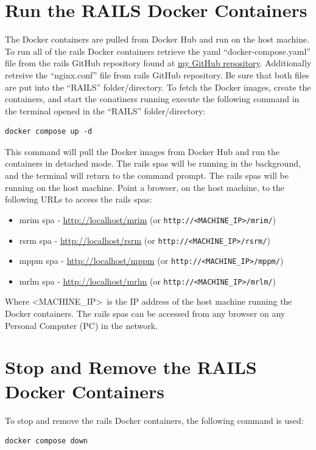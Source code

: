 \section{Run the RAILS Docker Containers}
\label{sec:railsdockercontainers}
The Docker containers are pulled from Docker Hub and run on the host machine. To run all of the \gls{rails} Docker containers retrieve the \gls{yaml} ``docker-compose.yaml'' file from the \gls{rails} GitHub repository found at \href{https://github.com/djbristow/RAILS/tree/master/Docker%20Based}{my GitHub repository}. Additionally retreive the ``nginx.conf'' file from \gls{rails} GitHub repository. Be sure that both files are put into the ``RAILS'' folder/directory. 
To fetch the Docker images, create the containers, and start the conatiners running execute the following command in the terminal opened in the ``RAILS'' folder/directory:
\begin{verbatim}
docker compose up -d
\end{verbatim}
This command will pull the Docker images from Docker Hub and run the containers in detached mode. The \gls{rails} \glspl{spa} will be running in the background, and the terminal will return to the command prompt.
The \gls{rails} \glspl{spa} will be running on the host machine.
Point a browser, on the host machine, to the following URLs to access the \gls{rails} \glspl{spa}:
\begin{itemize}
    \item \gls{mrim} \gls{spa} - \href{http://localhost/mrim}{http://localhost/mrim} (or \texttt{http://\textless MACHINE\_IP\textgreater /mrim/})
    \item \gls{rsrm} \gls{spa} - \href{http://localhost/rsrm}{http://localhost/rsrm} (or \texttt{http://\textless MACHINE\_IP\textgreater /rsrm/})
    \item \gls{mppm} \gls{spa} - \href{http://localhost/mppm}{http://localhost/mppm} (or \texttt{http://\textless MACHINE\_IP\textgreater /mppm/})
    \item \gls{mrlm} \gls{spa} - \href{http://localhost/mrlm}{http://localhost/mrlm} (or \texttt{http://\textless MACHINE\_IP\textgreater /mrlm/})
\end{itemize}
Where \textless MACHINE\_IP\textgreater\ is the IP address of the host machine running the Docker containers. The \gls{rails} \glspl{spa} can be accessed from any browser on any Personal Computer (PC) in the network.
\section{Stop and Remove the RAILS Docker Containers}
\label{sec:stopremoverailsdockercontainers}
To stop and remove the \gls{rails} Docker containers, the following command is used:
\begin{verbatim}
docker compose down
\end{verbatim}

